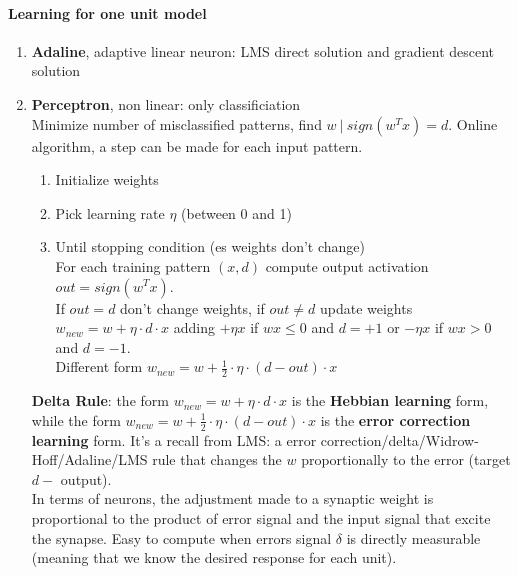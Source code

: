 \documentclass[10pt]{report}
\begin{document}
\paragraph{Learning for one unit model} \begin{enumerate}
	\item \textbf{Adaline}, adaptive linear neuron: LMS direct solution and gradient descent solution
	\item \textbf{Perceptron}, non linear: only classificiation\\
	Minimize number of misclassified patterns, find $w\:|\:sign(w^Tx) = d$. Online algorithm, a step can be made for each input pattern.
	\begin{enumerate}
		\item Initialize weights
		\item Pick learning rate $\eta$ (between 0 and 1)
		\item Until stopping condition (es weights don't change)\\
		For each training pattern $(x, d)$ compute output activation $out = sign(w^T x)$.\\
		If $out = d$ don't change weights, if $out \neq d$ update weights $w_{new} = w + \eta\cdot d\cdot x$ adding $+\eta x$ if $wx\leq 0$ and $d = +1$ or $-\eta x$ if $wx > 0$ and $d = -1$.\\Different form $w_{new} = w + \frac{1}{2}\cdot\eta\cdot (d-out)\cdot x$
	\end{enumerate}
	\textbf{Delta Rule}: the form $w_{new} = w + \eta\cdot d\cdot x$ is the \textbf{Hebbian learning} form, while the form $w_{new} = w + \frac{1}{2}\cdot\eta\cdot (d-out)\cdot x$ is the \textbf{error correction learning} form. It's a recall from LMS: a error correction/delta/Widrow-Hoff/Adaline/LMS rule that changes the $w$ proportionally to the error (target $d -$ output).\\
	In terms of neurons, the adjustment made to a synaptic weight is proportional to the product of error signal and the input signal that excite the synapse. Easy to compute when errors signal $\delta$ is directly measurable (meaning that we know the desired response for each unit).
\end{enumerate}
\end{document}
